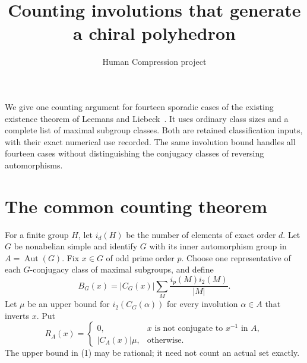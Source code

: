 \documentclass[11pt,a4paper]{article}
\title{Counting involutions that generate a chiral polyhedron}
\author{Human Compression project}\date{}
\newcommand{\ii}{i_2}
\newcommand{\Aut}{\operatorname{Aut}}
\begin{document}
\maketitle
We give one counting argument for fourteen sporadic cases of the existing
existence theorem of Leemans and Liebeck~\cite{LL}. It uses ordinary class
sizes and a complete list of maximal subgroup classes. Both are retained
classification inputs, with their exact numerical use recorded. The
same involution bound handles all fourteen cases without distinguishing
the conjugacy classes of reversing automorphisms.

\section{The common counting theorem}
For a finite group $H$, let $i_d(H)$ be the number of elements of exact
order $d$. Let $G$ be nonabelian simple and identify $G$ with its inner
automorphism group in $A=\Aut(G)$. Fix $x\in G$ of odd prime order $p$.
Choose one representative of each $G$-conjugacy class of maximal
subgroups, and define
\[
 B_G(x)=|C_G(x)|\sum_{M}\frac{i_p(M)\ii(M)}{|M|}.             \tag{1}
\]
Let $\mu$ be an upper bound for $\ii(C_G(\alpha))$ for every
involution $\alpha\in A$ that inverts $x$. Put
\[
 R_A(x)=
 \begin{cases}
 0,&x\text{ is not conjugate to }x^{-1}\text{ in }A,\\
 |C_A(x)|\mu,&\text{otherwise}.
 \end{cases}                                                \tag{2}
\]
The upper bound in (1) may be rational; it need not count an actual set
exactly.
\end{document}
